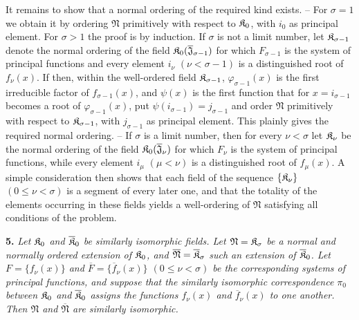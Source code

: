 It remains to show that a normal ordering of the required kind exists. -- For $\sigma=1$ we obtain it by ordering $\mathfrak N$ primitively with respect to $\mathfrak K_0$, with $i_0$ as principal element. For $\sigma>1$ the proof is by induction. If $\sigma$ is not a limit number, let $\mathfrak K_{\sigma-1}$ denote the normal ordering of the field $\mathfrak K_0(\overline{\mathfrak J}_{\sigma-1})$ for which $F_{\sigma-1}$ is the system of principal functions and every element $i_\nu$ $(\nu<\sigma-1)$ is a distinguished root of $f_\nu(x)$. If then, within the well-ordered field $\mathfrak K_{\sigma-1}$, $\varphi_{\sigma-1}(x)$ is the first irreducible factor of $f_{\sigma-1}(x)$, and $\psi(x)$ is the first function that for $x=i_{\sigma-1}$ becomes a root of $\varphi_{\sigma-1}(x)$, put $\psi(i_{\sigma-1})=j_{\sigma-1}$ and order $\mathfrak N$ primitively with respect to $\mathfrak K_{\sigma-1}$, with $j_{\sigma-1}$ as principal element. This plainly gives the required normal ordering. -- If $\sigma$ is a limit number, then for every $\nu<\sigma$ let $\mathfrak K_\nu$ be the normal ordering of the field $\mathfrak K_0(\overline{\mathfrak J}_\nu)$ for which $F_\nu$ is the system of principal functions, while every element $i_\mu$ $(\mu<\nu)$ is a distinguished root of $f_\mu(x)$. A simple consideration then shows that each field of the sequence $\{\mathfrak K_\nu\}$ $(0\leq\nu<\sigma)$ is a segment of every later one, and that the totality of the elements occurring in these fields yields a well-ordering of $\mathfrak N$ satisfying all conditions of the problem.

\textbf{5.} \emph{Let $\mathfrak K_0$ and $\overline{\mathfrak K}_0$ be similarly isomorphic fields. Let $\mathfrak N=\mathfrak K_\sigma$ be a normal and normally ordered extension of $\mathfrak K_0$, and $\overline{\mathfrak N}=\overline{\mathfrak K}_\sigma$ such an extension of $\overline{\mathfrak K}_0$. Let $F=\{f_\nu(x)\}$ and $\overline F=\{\overline f_\nu(x)\}$ $(0\leq\nu<\sigma)$ be the corresponding systems of principal functions, and suppose that the similarly isomorphic correspondence $\pi_0$ between $\mathfrak K_0$ and $\overline{\mathfrak K}_0$ assigns the functions $f_\nu(x)$ and $\overline f_\nu(x)$ to one another. Then $\mathfrak N$ and $\overline{\mathfrak N}$ are similarly isomorphic.}


